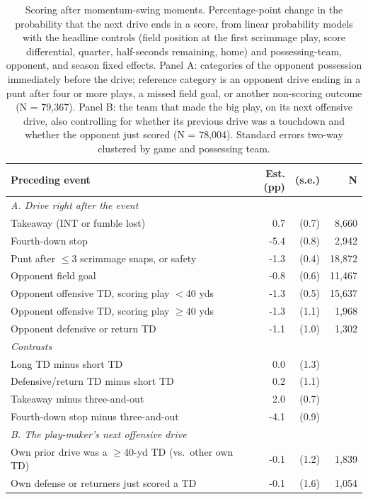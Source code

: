 \begin{table}[htbp]
\centering
\caption{\label{tab:swing} Scoring after momentum-swing moments. Percentage-point change in the probability that the next drive ends in a score, from linear probability models with the headline controls (field position at the first scrimmage play, score differential, quarter, half-seconds remaining, home) and possessing-team, opponent, and season fixed effects. Panel A: categories of the opponent possession immediately before the drive; reference category is an opponent drive ending in a punt after four or more plays, a missed field goal, or another non-scoring outcome (N = 79,367). Panel B: the team that made the big play, on its next offensive drive, also controlling for whether its previous drive was a touchdown and whether the opponent just scored (N = 78,004). Standard errors two-way clustered by game and possessing team.}
\begin{tabular}{lrrr}
\toprule
Preceding event & Est. (pp) & (s.e.) & N \\
\midrule
\multicolumn{4}{l}{\emph{A. Drive right after the event}} \\
Takeaway (INT or fumble lost) & 0.7 & (0.7) & 8,660 \\
Fourth-down stop & -5.4 & (0.8) & 2,942 \\
Punt after $\leq$3 scrimmage snaps, or safety & -1.3 & (0.4) & 18,872 \\
Opponent field goal & -0.8 & (0.6) & 11,467 \\
Opponent offensive TD, scoring play $<$40 yds & -1.3 & (0.5) & 15,637 \\
Opponent offensive TD, scoring play $\geq$40 yds & -1.3 & (1.1) & 1,968 \\
Opponent defensive or return TD & -1.1 & (1.0) & 1,302 \\
\multicolumn{4}{l}{\emph{Contrasts}} \\
\quad Long TD minus short TD & 0.0 & (1.3) &  \\
\quad Defensive/return TD minus short TD & 0.2 & (1.1) &  \\
\quad Takeaway minus three-and-out & 2.0 & (0.7) &  \\
\quad Fourth-down stop minus three-and-out & -4.1 & (0.9) &  \\
\midrule
\multicolumn{4}{l}{\emph{B. The play-maker's next offensive drive}} \\
Own prior drive was a $\geq$40-yd TD (vs.\ other own TD) & -0.1 & (1.2) & 1,839 \\
Own defense or returners just scored a TD & -0.1 & (1.6) & 1,054 \\
\bottomrule
\end{tabular}
\end{table}
